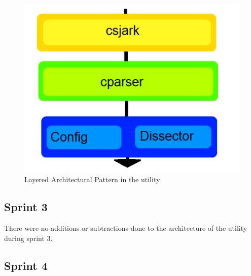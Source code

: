 \begin{figure}[htb]
	\includegraphics[width = \textwidth]{./planning/img/layered}
	\caption{Layered Architectural Pattern in the \gls{utility}\label{fig:layered}}
\end{figure}



\subsection{Sprint 3}
There were no additions or subtractions done to the architecture of the utility during sprint 3.

\subsection{Sprint 4}


